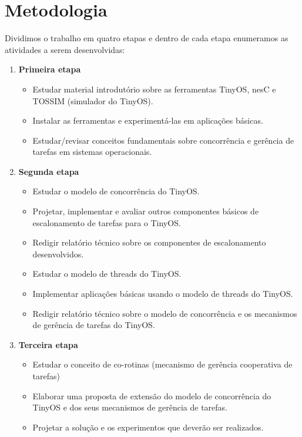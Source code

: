 \documentclass[a4paper, 10pt]{article}
\begin{document}
\section{Metodologia}\label{metodologia}
Dividimos o trabalho em quatro etapas e dentro de cada etapa enumeramos as atividades
a serem desenvolvidas: 
\begin{enumerate}
\item {\bf Primeira etapa} %
\begin{itemize}
  \item Estudar material introdutório sobre as ferramentas TinyOS, nesC e TOSSIM (simulador do TinyOS).
  \item Instalar as ferramentas e experimentá-las em aplicações básicas.
  \item Estudar/revisar conceitos fundamentais sobre concorrência e gerência de tarefas em sistemas operacionais.
\end{itemize}
\item {\bf Segunda etapa} %
\begin{itemize}
  \item Estudar o modelo de concorrência do TinyOS.
  \item Projetar, implementar e avaliar outros componentes básicos de escalonamento de
  tarefas para o TinyOS.
  \item Redigir relatório técnico sobre os componentes de escalonamento desenvolvidos.
  \item Estudar o modelo de threads do TinyOS.
  \item Implementar aplicações básicas usando o modelo de threads do TinyOS.
  \item Redigir relatório técnico sobre o modelo de concorrência e os mecanismos de gerência de tarefas do TinyOS.
\end{itemize}
\item {\bf Terceira etapa} %
\begin{itemize}
  \item Estudar o conceito de co-rotinas (mecanismo de gerência cooperativa de tarefas)
  \item Elaborar uma proposta de extensão do modelo de concorrência do TinyOS e
  dos seus mecanismos de gerência de tarefas.
  \item Projetar a solução e os experimentos que deverão ser realizados.

\end{itemize}
\end{enumerate}
\end{document}

